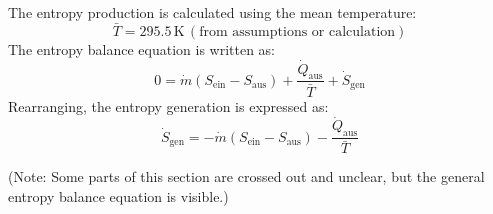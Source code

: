 The entropy production is calculated using the mean temperature:  
\[
\bar{T} = 295.5 \, \text{K} \, (\text{from assumptions or calculation})
\]  
The entropy balance equation is written as:  
\[
0 = \dot{m} (S_{\text{ein}} - S_{\text{aus}}) + \frac{\dot{Q}_{\text{aus}}}{\bar{T}} + \dot{S}_{\text{gen}}
\]  
Rearranging, the entropy generation is expressed as:  
\[
\dot{S}_{\text{gen}} = -\dot{m} (S_{\text{ein}} - S_{\text{aus}}) - \frac{\dot{Q}_{\text{aus}}}{\bar{T}}
\]  

(Note: Some parts of this section are crossed out and unclear, but the general entropy balance equation is visible.)